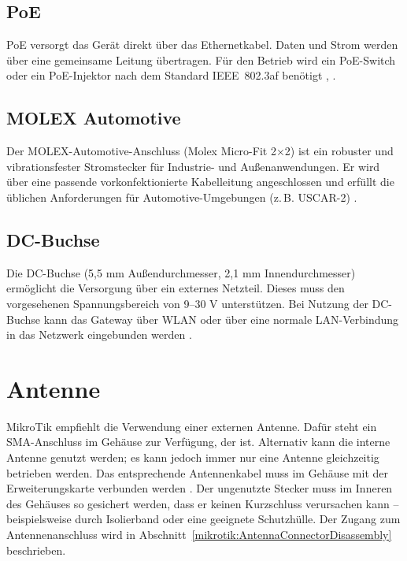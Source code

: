 	\subsection{PoE}
	PoE versorgt das Gerät direkt über das Ethernetkabel. Daten und Strom werden über eine gemeinsame Leitung übertragen. Für den Betrieb wird ein PoE-Switch oder ein PoE-Injektor nach dem Standard IEEE~802.3af benötigt \cite{Shen:2019}, \cite{mikrotik:2020}.
	
	\subsection{MOLEX Automotive}
	Der MOLEX-Automotive-Anschluss (Molex Micro-Fit 2×2) ist ein robuster und vibrationsfester Stromstecker für Industrie- und Au{\ss}enanwendungen. Er wird über eine passende vorkonfektionierte Kabelleitung angeschlossen und erfüllt die üblichen Anforderungen für Automotive-Umgebungen (z.\,B. USCAR-2) \cite{mikrotik:2020}.
	
	\subsection{DC-Buchse}
	Die DC-Buchse (5,5 mm Au{\ss}endurchmesser, 2,1 mm Innendurchmesser) ermöglicht die Versorgung über ein externes Netzteil. Dieses muss den vorgesehenen Spannungsbereich von 9–30 V unterstützen. Bei Nutzung der DC-Buchse kann das Gateway über WLAN oder über eine normale LAN-Verbindung in das Netzwerk eingebunden werden \cite{mikrotik:2020}.
	

\section{Antenne \label{mikrotik:antenna}}
	MikroTik empfiehlt die Verwendung einer externen Antenne. Dafür steht ein SMA-Anschluss im Gehäuse zur Verfügung, der \textbf{ } ist. Alternativ kann die interne Antenne genutzt werden; es kann jedoch immer nur eine Antenne gleichzeitig betrieben werden. Das entsprechende Antennenkabel muss im Gehäuse mit der Erweiterungskarte verbunden werden \cite{mikrotik:2025}. Der ungenutzte Stecker muss im Inneren des Gehäuses so gesichert werden, dass er keinen Kurzschluss verursachen kann – beispielsweise durch Isolierband oder eine geeignete Schutzhülle. Der Zugang zum Antennenanschluss wird in Abschnitt~\ref{mikrotik:AntennaConnectorDisassembly} beschrieben.

